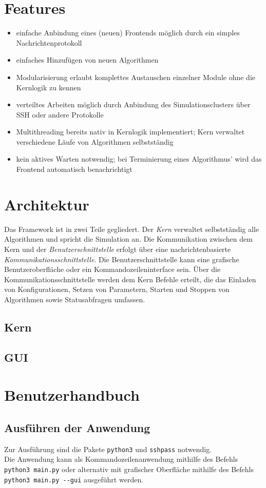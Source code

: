 \documentclass[
  a4paper,               %
  twoside,               %
  DIV=12,                %
  BCOR=8mm,              %
  headinclude=true,      %
  footinclude=false,     %
  numbers=noenddot,      %
  headheight=40pt,       %
  11pt]{scrartcl}        %
\begin{document}
\section{Features}
\begin{itemize}
\item einfache Anbindung eines (neuen) Frontends möglich durch ein simples Nachrichtenprotokoll
\item einfaches Hinzufügen von neuen Algorithmen
\item Modularisierung erlaubt komplettes Austauschen einzelner Module ohne die Kernlogik zu kennen
\item verteiltes Arbeiten möglich durch Anbindung des Simulationsclusters über SSH oder andere Protokolle
\item Multithreading bereits nativ in Kernlogik implementiert; Kern verwaltet verschiedene Läufe von Algorithmen selbstständig
\item kein aktives Warten notwendig; bei Terminierung eines Algorithmus' wird das Frontend automatisch benachrichtigt

\end{itemize}


\section{Architektur}
Das Framework ist in zwei Teile gegliedert. Der \emph{Kern} verwaltet selbstständig alle Algorithmen und spricht die Simulation an. Die Kommunikation zwischen dem Kern und der \emph{Benutzerschnittstelle} erfolgt über eine nachrichtenbasierte \emph{Kommunikationsschnittstelle}. Die Benutzerschnittstelle kann eine grafische Benutzeroberfläche oder ein Kommandozeileninterface sein. Über die Kommunikationsschnittstelle werden dem Kern Befehle erteilt, die das Einladen von Konfigurationen, Setzen von Parametern, Starten und Stoppen von Algorithmen sowie Statusabfragen umfassen.
\subsection{Kern}

\subsection{GUI}

\section{Benutzerhandbuch}
\subsection{Ausführen der Anwendung}
Zur Ausführung sind die Pakete \texttt{python3} und \texttt{sshpass} notwendig.\\
Die Anwendung kann als Kommandozeilenanwendung mithilfe des Befehls \texttt{python3 main.py} oder alternativ mit grafischer Oberfläche mithilfe des Befehls \texttt{python3 main.py -{}-gui} ausgeführt werden.
\end{document}
